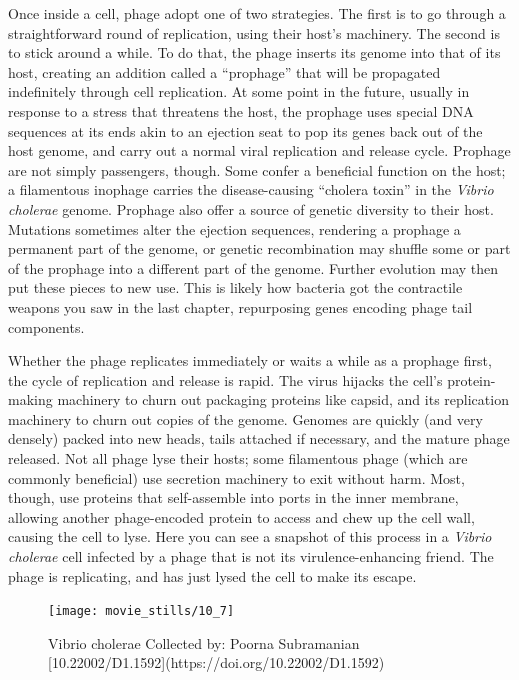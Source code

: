 \documentclass[]{tufte-book}
\begin{document}
Once inside a cell, phage adopt one of two strategies. The first is to
go through a straightforward round of replication, using their host's
machinery. The second is to stick around a while. To do that, the phage
inserts its genome into that of its host, creating an addition called a
``prophage'' that will be propagated indefinitely through cell
replication. At some point in the future, usually in response to a
stress that threatens the host, the prophage uses special DNA sequences
at its ends akin to an ejection seat to pop its genes back out of the
host genome, and carry out a normal viral replication and release cycle.
Prophage are not simply passengers, though. Some confer a beneficial
function on the host; a filamentous inophage carries the disease-causing
``cholera toxin'' in the \emph{Vibrio cholerae} genome. Prophage also
offer a source of genetic diversity to their host. Mutations sometimes
alter the ejection sequences, rendering a prophage a permanent part of
the genome, or genetic recombination may shuffle some or part of the
prophage into a different part of the genome. Further evolution may then
put these pieces to new use. This is likely how bacteria got the
contractile weapons you saw in the last chapter, repurposing genes
encoding phage tail components.

Whether the phage replicates immediately or waits a while as a prophage
first, the cycle of replication and release is rapid. The virus hijacks
the cell's protein-making machinery to churn out packaging proteins like
capsid, and its replication machinery to churn out copies of the genome.
Genomes are quickly (and very densely) packed into new heads, tails
attached if necessary, and the mature phage released. Not all phage lyse
their hosts; some filamentous phage (which are commonly beneficial) use
secretion machinery to exit without harm. Most, though, use proteins
that self-assemble into ports in the inner membrane, allowing another
phage-encoded protein to access and chew up the cell wall, causing the
cell to lyse. Here you can see a snapshot of this process in a
\emph{Vibrio cholerae} cell infected by a phage that is not its
virulence-enhancing friend. The phage is replicating, and has just lysed
the cell to make its escape.

\begin{figure}
\texttt{[image: movie\_stills/10\_7]} \caption[Vibrio cholerae Collected by]{Vibrio cholerae Collected by: Poorna Subramanian [10.22002/D1.1592](https://doi.org/10.22002/D1.1592)}\label{fig:unnamed-chunk-179}
\end{figure}
\end{document}
